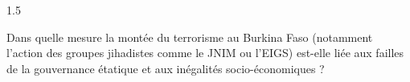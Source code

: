 \documentclass[12pt]{article}
\begin{document}
\begin{spacing}{1.5}

Dans quelle mesure la montée du terrorisme au Burkina Faso (notamment l'action des groupes jihadistes comme le JNIM ou l'EIGS) est-elle liée aux failles de la gouvernance étatique et aux inégalités socio-économiques ?


\quad

\end{spacing}
\end{document}
